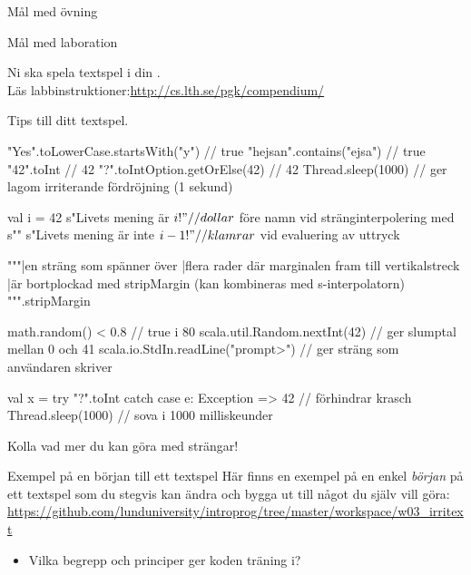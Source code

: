 \ifkompendium\else
{}

\begin{SlideExtra}{Mål med övning \ExeWeekTHREE}
\begin{itemize}\SlideFontSmall
  
\end{itemize}
\end{SlideExtra}

\begin{SlideExtra}{Mål med laboration \LabWeekTHREE}
\begin{itemize}
  
\end{itemize}
Ni ska spela  textspel i din .\\
Läs labbinstruktioner:\url{http://cs.lth.se/pgk/compendium/}
\end{SlideExtra}


\begin{SlideExtra}{Tips till ditt textspel.}
\begin{CodeSmall}
"Yes".toLowerCase.startsWith("y")    // true
"hejsan".contains("ejsa")            // true
"42".toInt                           // 42
"?".toIntOption.getOrElse(42)        // 42
Thread.sleep(1000)                   // ger lagom irriterande fördröjning (1 sekund)

val i = 42
s"Livets mening är $i!" // dollar $ före namn vid stränginterpolering med s""
s"Livets mening är inte ${i-1}!"  // klamrar ${} vid evaluering av uttryck

"""|en sträng som spänner över
   |flera rader där marginalen fram till vertikalstreck
   |är bortplockad med stripMargin (kan kombineras med s-interpolatorn)
""".stripMargin

math.random() < 0.8                  // true i 80%
scala.util.Random.nextInt(42)      // ger slumptal mellan 0 och 41
scala.io.StdIn.readLine("prompt>") // ger sträng som användaren skriver

val x = try { "?".toInt } catch { case e: Exception => 42 }  // förhindrar krasch
Thread.sleep(1000)    // sova i 1000 milliskeunder
\end{CodeSmall}
Kolla  vad mer du kan göra med strängar!
\end{SlideExtra}

\begin{SlideExtra}{Exempel på en början till ett textspel}
  Här finns en exempel på en enkel \emph{början} på ett textspel som du stegvis kan ändra och bygga ut till något du själv vill göra:
  \url{https://github.com/lunduniversity/introprog/tree/master/workspace/w03_irritext}

\begin{itemize}
  \item Vilka begrepp och principer ger koden träning i?
\end{itemize}

\end{SlideExtra}

